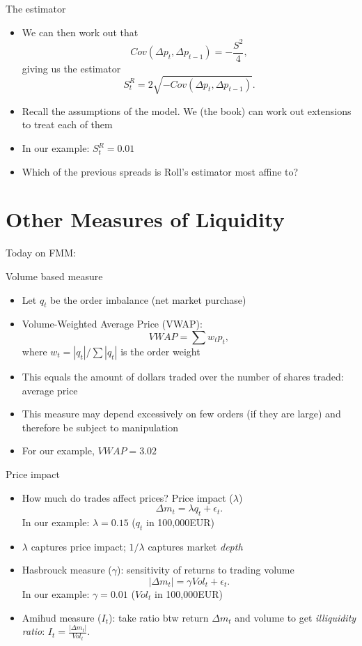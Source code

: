 \begin{frame}{The estimator}
	\begin{itemize}
		\item We can then work out that
		\[
		Cov(\Delta p_t, \Delta p_{t-1}) = - \frac{S^2}{4},
		\]
		giving us the estimator
		\[
		S^R_t = 2 \sqrt{-Cov(\Delta p_t, \Delta p_{t-1})}.
		\]
		\item Recall the assumptions of the model. We (the book) can work out extensions to treat each of them
		\item In our example: $S^R_t = 0.01$
		\item Which of the previous spreads is Roll's estimator most affine to?
	\end{itemize}
\end{frame}


\section{Other Measures of Liquidity}

\begin{frame}{Today on FMM:}
	\tableofcontents[currentsection]
\end{frame}


\begin{frame}{Volume based measure}
\begin{itemize}
	\item Let $q_t$ be the order imbalance (net market purchase)
	\item \alert{Volume-Weighted Average Price} (VWAP):
	\[
	VWAP = \sum  w_t p_t,
	\]
	where $w_t = |q_t|/\sum |q_t|$ is the order weight
	\item  This equals the amount of dollars traded over the number of shares traded: average price
	\item This measure may depend excessively on few orders (if they are large) and therefore be subject to manipulation
	\item For our example, $VWAP=3.02$
\end{itemize}
\end{frame}


\begin{frame}{Price impact}
\begin{itemize}
	\item How much do trades affect prices? \alert{Price impact} ($\lambda$)
	\[
	\Delta m_t = \lambda q_t + \epsilon_t.
	\]
	In our example: $\lambda = 0.15 $ ($q_t$ in 100,000EUR)
	\item  $\lambda$ captures price impact;  $1/\lambda$ captures market \textit{depth}
	\item \alert{Hasbrouck measure} ($\gamma$): sensitivity of returns to trading volume
	\[
	|\Delta m_t | = \gamma Vol_t + \epsilon_t.
	\]
	In our example: $\gamma = 0.01$ ($Vol_t$ in 100,000EUR)
	\item \alert{Amihud measure} ($I_t$): take ratio btw return $\Delta m_t$ and volume to get \textit{illiquidity ratio}: 
	\center
	$I_t = \frac{|\Delta m_t|}{Vol_t}$.
\end{itemize}
\end{frame}



